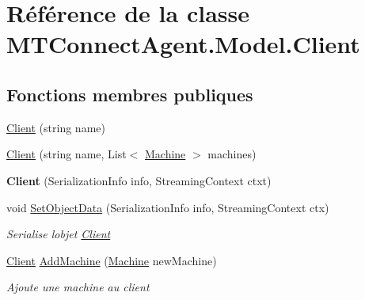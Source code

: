 \hypertarget{class_m_t_connect_agent_1_1_model_1_1_client}{}\section{Référence de la classe M\+T\+Connect\+Agent.\+Model.\+Client}
\label{class_m_t_connect_agent_1_1_model_1_1_client}
\subsection*{Fonctions membres publiques}
\begin{DoxyCompactItemize}
\item 
\mbox{\hyperlink{class_m_t_connect_agent_1_1_model_1_1_client_ad2d781a6f230ec83ccee4f7221a5a577}{Client}} (string name)
\item 
\mbox{\hyperlink{class_m_t_connect_agent_1_1_model_1_1_client_ac519ea113d1eae1e94b96052c6ccfec6}{Client}} (string name, List$<$ \mbox{\hyperlink{class_m_t_connect_agent_1_1_model_1_1_machine}{Machine}} $>$ machines)
\item 
\mbox{\label{class_m_t_connect_agent_1_1_model_1_1_client_a1418f6bce9620188070855acae02aaeb}} 
{\bfseries Client} (Serialization\+Info info, Streaming\+Context ctxt)
\item 
void \mbox{\hyperlink{class_m_t_connect_agent_1_1_model_1_1_client_a707b7a8486e7ee79d9986f6aa1729f4e}{Set\+Object\+Data}} (Serialization\+Info info, Streaming\+Context ctx)
\begin{DoxyCompactList}\small\item\em Serialise l\textquotesingle{}objet \mbox{\hyperlink{class_m_t_connect_agent_1_1_model_1_1_client}{Client}} \end{DoxyCompactList}\item 
\mbox{\hyperlink{class_m_t_connect_agent_1_1_model_1_1_client}{Client}} \mbox{\hyperlink{class_m_t_connect_agent_1_1_model_1_1_client_a692b1cbfd5063222488d3af36d8fd703}{Add\+Machine}} (\mbox{\hyperlink{class_m_t_connect_agent_1_1_model_1_1_machine}{Machine}} new\+Machine)
\begin{DoxyCompactList}\small\item\em Ajoute une machine au client \end{DoxyCompactList}\end{DoxyCompactItemize}
